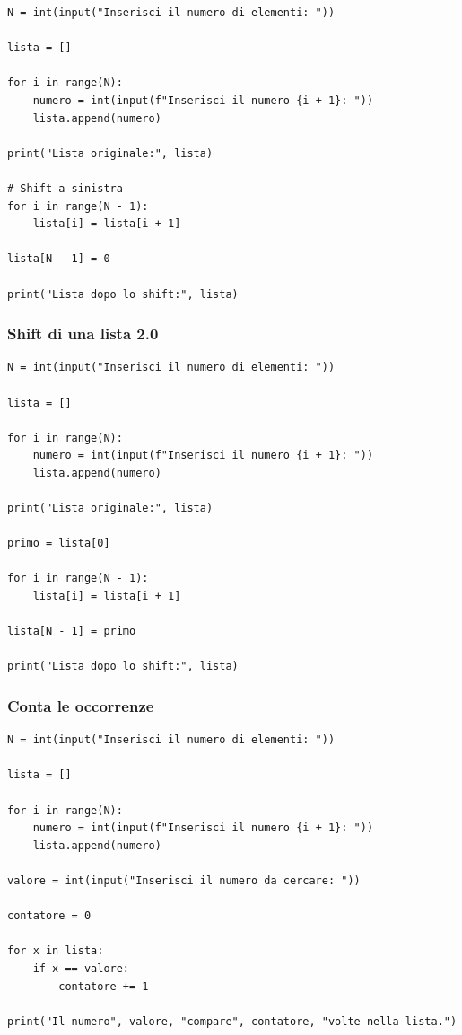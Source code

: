 \documentclass[a4paper,12pt]{article}
\begin{document}
\begin{lstlisting}
N = int(input("Inserisci il numero di elementi: "))
	
lista = []
	
for i in range(N):
	numero = int(input(f"Inserisci il numero {i + 1}: "))
	lista.append(numero)
	
print("Lista originale:", lista)
	
# Shift a sinistra
for i in range(N - 1):
	lista[i] = lista[i + 1]

lista[N - 1] = 0
	
print("Lista dopo lo shift:", lista)
\end{lstlisting}

\newpage

\subsubsection{Shift di una lista 2.0}
\begin{lstlisting}
N = int(input("Inserisci il numero di elementi: "))

lista = []

for i in range(N):
	numero = int(input(f"Inserisci il numero {i + 1}: "))
	lista.append(numero)

print("Lista originale:", lista)

primo = lista[0]

for i in range(N - 1):
	lista[i] = lista[i + 1]

lista[N - 1] = primo

print("Lista dopo lo shift:", lista)
\end{lstlisting}

\newpage

\subsubsection{Conta le occorrenze}
\begin{lstlisting}
N = int(input("Inserisci il numero di elementi: "))

lista = []

for i in range(N):
	numero = int(input(f"Inserisci il numero {i + 1}: "))
	lista.append(numero)

valore = int(input("Inserisci il numero da cercare: "))

contatore = 0

for x in lista:
	if x == valore:
		contatore += 1

print("Il numero", valore, "compare", contatore, "volte nella lista.")
\end{lstlisting}
\newpage
\end{document}
